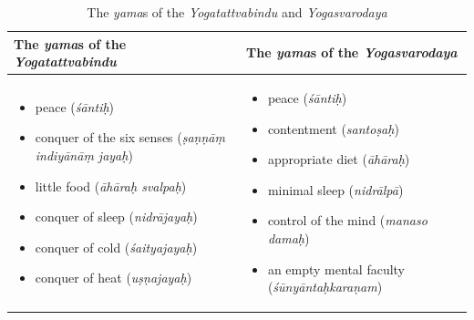 \footnotesize
\begin{table}[H]
    \footnotesize
\centering
\begin{tabular}{|m{5cm}|m{5cm}|}
\hline
\textbf{The \textit{yama}s of the \textit{Yogatattvabindu}} & \textbf{The \textit{yama}s of the \textit{Yogasvarodaya}} \\
\hline
\begin{itemize}
\item peace (\textit{śāntiḥ})
\item conquer of the six senses (\textit{ṣaṇṇāṃ indiyānāṃ jayaḥ})
\item little food (\textit{āhāraḥ svalpaḥ})
\item conquer of sleep (\textit{nidrājayaḥ})
\item conquer of cold (\textit{śaityajayaḥ})
\item conquer of heat (\textit{uṣṇajayaḥ})
\end{itemize}
&
\begin{itemize}
\item peace (\textit{śāntiḥ})
\item contentment (\textit{santoṣaḥ})
\item appropriate diet (\textit{āhāraḥ})
\item minimal sleep (\textit{nidrālpā})
\item control of the mind (\textit{manaso damaḥ})
\item an empty mental faculty (\textit{śūnyāntaḥkaraṇam})
\end{itemize}
\\
\hline
\end{tabular}
\caption{The \textit{yama}s of the \textit{Yogatattvabindu} and \textit{Yogasvarodaya}}
\normalsize
\end{table}

